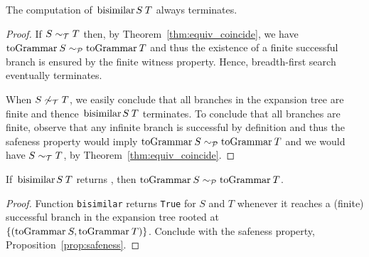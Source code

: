\begin{lemma}[Termination]
\label{lem:termination}
	The computation of $\bisimf S T$ always terminates.
\end{lemma}
%
\begin{proof}
	If $S\sim_\mathcal T T$ then, by Theorem~\ref{thm:equiv_coincide},
	we have $\toGrammarf{S} \ProdEquiv \toGrammarf{T} $ and thus the existence of a finite
	successful branch is ensured by the finite witness property. 
	Hence, breadth-first search eventually terminates. 
	
	When $S\not\sim_\mathcal T T$, we easily conclude that all branches
        in the expansion tree are finite and thence $\bisimf S T$
        terminates.  To conclude that all branches are finite, observe
        that any infinite branch is successful by definition and thus
        the safeness property would imply $\toGrammarf{S}\ProdEquiv \toGrammarf{T}$ and we
        would have $S\sim_\mathcal T T$, by 
        Theorem~\ref{thm:equiv_coincide}.
\end{proof}


\begin{lemma}
  \label{lem:bisimilar-to-prod}
  If $\bisimf S T$ returns , then
  $\toGrammarf{S}\ProdEquiv \toGrammarf{T}$.
\end{lemma}

\begin{proof}
  Function \lstinline|bisimilar| returns \lstinline|True| for $S$ and
  $T$ whenever it reaches a (finite) successful branch in the expansion
  tree rooted at $\{(\toGrammarf{S},\toGrammarf{T})\}$. Conclude with the safeness property,
  Proposition~\ref{prop:safeness}.
\end{proof}


